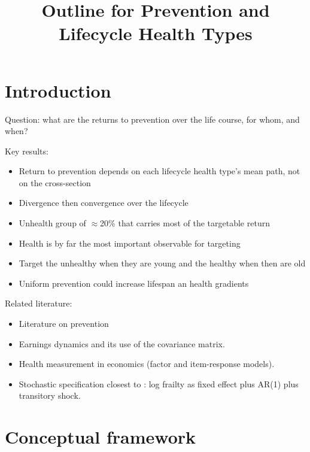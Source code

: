 \documentclass[11pt]{article}
\title{Outline for Prevention and Lifecycle Health Types}
\author{}
\begin{document}
\maketitle

\section{Introduction}

Question: what are the returns to prevention over the life course, for whom, and when?

Key results:
\begin{itemize}
	\item Return to prevention depends on each lifecycle health type's mean path, not on the cross-section
	\item Divergence then convergence over the lifecycle
	\item Unhealth group of $\approx$20\% that carries most of the targetable return
	\item Health is by far the most important observable for targeting
	\item Target the unhealthy when they are young and the healthy when then are old
	\item Uniform prevention could increase lifespan an health gradients
\end{itemize}

Related literature:
\begin{itemize}
	\item Literature on prevention
	\item Earnings dynamics and its use of the covariance matrix.
	\item Health measurement in economics (factor and item-response models).
	\item Stochastic specification closest to \citet{hosseini2022}: log frailty as fixed effect plus AR(1) plus transitory shock.
\end{itemize}


\section{Conceptual framework}
\label{sec:framework}
\end{document}
